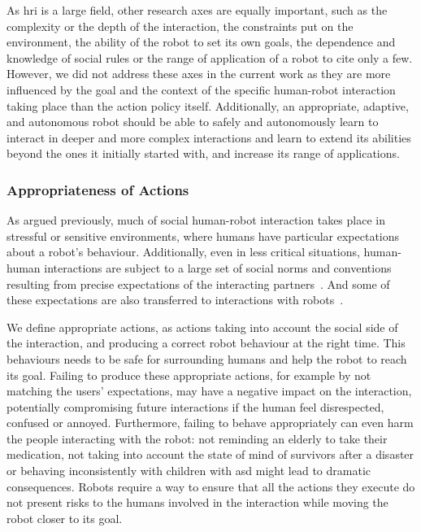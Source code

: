     As \gls{hri} is a large field, other research axes are equally important, such as the complexity or the depth of the interaction, the constraints put on the environment, the ability of the robot to set its own goals, the dependence and knowledge of social rules or the range of application of a robot to cite only a few. However, we did not address these axes in the current work as they are more influenced by the goal and the context of the specific human-robot interaction taking place than the action policy itself. Additionally, an appropriate, adaptive, and autonomous robot should be able to safely and autonomously learn to interact in deeper and more complex interactions and learn to extend its abilities beyond the ones it initially started with, and increase its range of applications.

\subsubsection{Appropriateness of Actions} \label{ssec:appropriateness} %
    As argued previously, much of social human-robot interaction takes place in  stressful or sensitive environments, where humans have particular expectations about a robot's behaviour. Additionally, even in less critical situations, human-human interactions are subject to a large set of social norms and conventions resulting from precise expectations of the interacting partners~\citep{sherif1936psychology}. And some of these expectations are also transferred to interactions with robots~\citep{bartneck2004design}.
    
    We define appropriate actions, as actions taking into account the social side of the interaction, and producing a correct robot behaviour at the right time. This behaviours needs to be safe for surrounding humans and help the robot to reach its goal. Failing to produce these appropriate actions, for example by not matching the users' expectations, may have a negative impact on the interaction, potentially compromising future interactions if the human feel disrespected, confused or annoyed. Furthermore, failing to behave appropriately can even harm the people interacting with the robot: not reminding an elderly to take their medication, not taking into account the state of mind of survivors after a disaster or behaving inconsistently with children with \gls{asd} might lead to dramatic consequences. Robots require a way to ensure that all the actions they execute do not present risks to the humans involved in the interaction while moving the robot closer to its goal.
	
